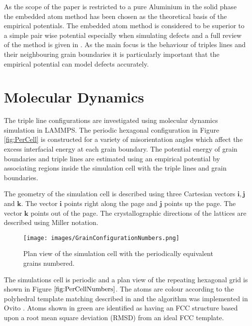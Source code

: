 \documentclass[12pt,a4paper,openany]{report}
\begin{document}
As the scope of the paper is restricted to a pure Aluminium in the solid phase the embedded atom method has been chosen as the theoretical basis of the empirical potentials. The embedded atom method is considered to be superior to a simple pair wise potential especially when simulating defects and a full review of the method is given in \cite{Daw1993}. As the main focus is the behaviour of triples lines and their neighbouring grain boundaries it is particularly important that the empirical potential can model defects accurately. 

\chapter{Molecular Dynamics} \label{ch:MD}

The triple line configurations are investigated using molecular dynamics simulation in LAMMPS. The periodic hexagonal configuration in Figure \ref{fig:PerCell} is constructed for a variety of misorientation angles which affect the excess interfacial energy at each grain boundary. The potential energy of grain boundaries and triple lines are estimated using an empirical potential by associating regions inside the simulation cell with the triple lines and grain boundaries. 

The geometry of the simulation cell is described using three Cartesian vectors $\mathbf{i}, \mathbf{j}$ and $\mathbf{k}$. The vector $\mathbf{i}$ points right along the page and $\mathbf{j}$  points up the page. The vector $\mathbf{k}$ points out of the page. The crystallographic directions of the lattices are described using Miller notation.

\begin{figure}
	\texttt{[image: images/GrainConfigurationNumbers.png]}
	\caption{Plan view of the simulation cell with the periodically equivalent grains numbered.}
	\label{fig:PerCellNumbers} 
\end{figure}

The simulations cell is periodic and a plan view of the repeating hexagonal grid is shown in Figure $\ref{fig:PerCellNumbers}$. The atoms are colour according to the polyhedral template matching described in \cite{Larsen_2016} and the algorithm  was implemented in Ovito \cite{Stukowski2009}. Atoms shown in green are identified as having an FCC structure based upon a root mean square deviation (RMSD) from an ideal FCC template. 
\end{document}

